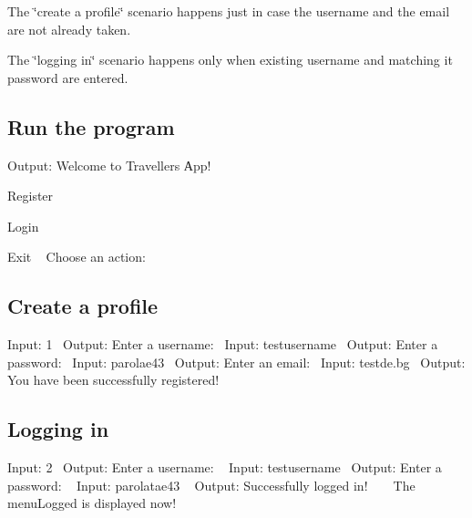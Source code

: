 \begin{DoxyItemize}
\item The \char`\"{}create a profile\char`\"{} scenario happens just in case the username and the email are not already taken. ~\newline

\item The \char`\"{}logging in\char`\"{} scenario happens only when existing username and matching it password are entered. ~\newline
 
\end{DoxyItemize}\hypertarget{index_running}{}\subsection{Run the program}\label{index_running}
Output\+: Welcome to Traveller\textquotesingle{}s Аpp!
\begin{DoxyEnumerate}
\item Register
\item Login
\item Exit ~\newline
 Choose an action\+: 
\end{DoxyEnumerate}\hypertarget{index_create}{}\subsection{Create a profile}\label{index_create}
Input\+: 1~\newline
 Output\+: Enter a username\+:~\newline
 Input\+: testusername~\newline
 Output\+: Enter a password\+:~\newline
 Input\+: parolae43~\newline
 Output\+: Enter an email\+:~\newline
 Input\+: testde.\+bg~\newline
 Output\+: You have been successfully registered!\hypertarget{index_login}{}\subsection{Logging in}\label{index_login}
Input\+: 2~\newline
 Output\+: Enter a username\+: ~\newline
 Input\+: testusername~\newline
 Output\+: Enter a password\+: ~\newline
 Input\+: parolatae43 ~\newline
 Output\+: Successfully logged in! ~\newline
 ~\newline
 The menu\+Logged is displayed now! ~\newline
 
